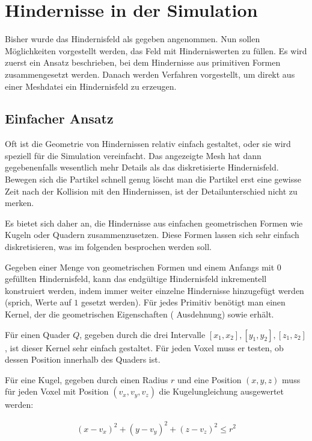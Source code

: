 \section{Hindernisse in der Simulation}
\label{sec:implementation_boundaries}

Bisher wurde das Hindernisfeld  als
gegeben angenommen. Nun sollen Möglichkeiten vorgestellt werden, das
Feld mit Hinderniswerten zu füllen. Es wird zuerst ein Ansatz
beschrieben, bei dem Hindernisse aus primitiven Formen zusammengesetzt
werden. Danach werden Verfahren vorgestellt, um direkt aus einer
Meshdatei ein Hindernisfeld zu erzeugen.

\subsection{Einfacher Ansatz}

Oft ist die Geometrie von Hindernissen relativ einfach gestaltet, oder
sie wird speziell für die Simulation vereinfacht. Das angezeigte Mesh
hat dann gegebenenfalls wesentlich mehr Details als das diskretisierte
Hindernisfeld. Bewegen sich die Partikel schnell genug \Pimiddybzw
löscht man die Partikel erst eine gewisse Zeit nach der Kollision mit
den Hindernissen, ist der Detailunterschied nicht zu merken.

Es bietet sich daher an, die Hindernisse aus einfachen geometrischen
Formen wie Kugeln oder Quadern zusammenzusetzen. Diese Formen lassen
sich sehr einfach diskretisieren, was im folgenden besprochen werden soll.

Gegeben einer Menge von geometrischen Formen und einem Anfangs mit $0$
gefüllten Hindernisfeld, kann das endgültige Hindernisfeld
inkrementell konstruiert werden, indem immer weiter einzelne
Hindernisse hinzugefügt werden (sprich, Werte auf $1$ gesetzt
werden). Für jedes Primitiv benötigt man einen Kernel, der die
geometrischen Eigenschaften (\PimiddyzB{} Ausdehnung) sowie
 erhält.

Für einen Quader $Q$, gegeben durch die drei Intervalle
$[x_1,x_2],[y_1,y_2],[z_1,z_2]$, ist dieser Kernel sehr einfach
gestaltet. Für jeden Voxel muss er testen, ob dessen Position
innerhalb des Quaders ist.

Für eine Kugel, gegeben durch einen Radius $r$ und eine Position
$(x,y,z)$ muss für jeden Voxel mit Position $(v_x,v_y,v_z)$ die
Kugelungleichung ausgewertet werden:

\begin{align}
{(x-v_x)}^2 + {(y-v_y)}^2 + {(z-v_z)}^2 \leq r^2
\end{align}

